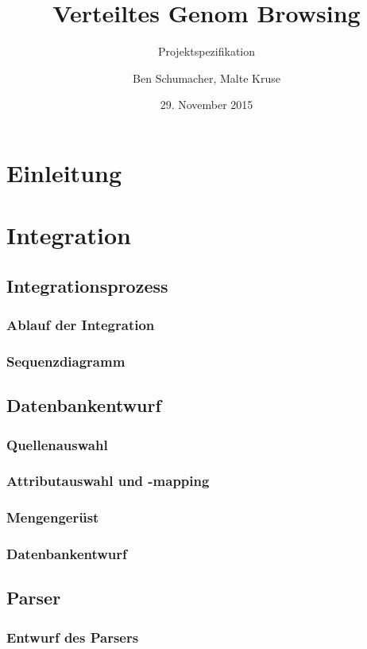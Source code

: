 \documentclass{scrartcl}
\title{Verteiltes Genom Browsing}
\subtitle{Projektspezifikation}
\author{Ben Schumacher, Malte Kruse}
\date{29. November 2015}
\begin{document}
\setcounter{page}{-1}
\maketitle
\thispagestyle{empty}
\newpage

\tableofcontents
\thispagestyle{empty}
\newpage

\section{Einleitung}
\newpage

\section{Integration}
\subsection{Integrationsprozess}
\subsubsection{Ablauf der Integration}
\subsubsection{Sequenzdiagramm}
\subsection{Datenbankentwurf}
\subsubsection{Quellenauswahl}
\subsubsection{Attributauswahl und -mapping}
\subsubsection{Mengengerüst}
\subsubsection{Datenbankentwurf}
\subsection{Parser}
\subsubsection{Entwurf des Parsers}
\end{document}
